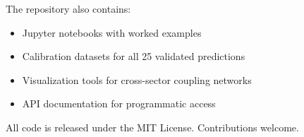 \documentclass[13pt,a4paper]{article}
\begin{document}
	\noindent The repository also contains:
	\begin{itemize}
		\item Jupyter notebooks with worked examples
		\item Calibration datasets for all 25 validated predictions
		\item Visualization tools for cross-sector coupling networks
		\item API documentation for programmatic access
	\end{itemize}
	
	\noindent All code is released under the MIT License. Contributions welcome.
	
\end{document}

